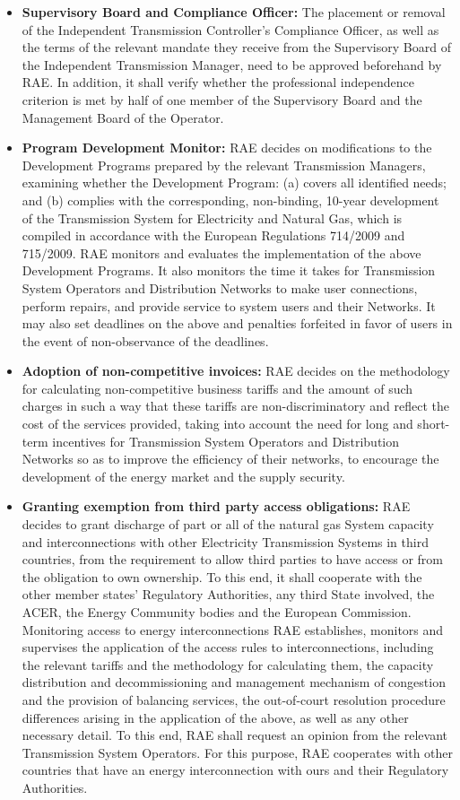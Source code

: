 \begin{itemize}
\item{\textbf{Supervisory Board and Compliance Officer:}}
The placement or removal of the Independent Transmission Controller's Compliance Officer, as well as the terms of the relevant mandate they receive from the Supervisory Board of the Independent Transmission Manager, need to be approved beforehand by RAE. In addition, it shall verify whether the professional independence criterion is met by half of one member of the Supervisory Board and the Management Board of the Operator.
\item{\textbf{Program Development Monitor:}}
RAE decides on modifications to the Development Programs prepared by the relevant Transmission Managers, examining whether the Development Program: (a) covers all identified needs; and (b) complies with the corresponding, non-binding, 10-year development of the Transmission System for Electricity and Natural Gas, which is compiled in accordance with the European Regulations 714/2009 and 715/2009. RAE monitors and evaluates the implementation of the above Development Programs. It also monitors the time it takes for Transmission System Operators and Distribution Networks to make user connections, perform repairs, and provide service to system users and their Networks. It may also set deadlines on the above and penalties forfeited in favor of users in the event of non-observance of the deadlines.
\item{\textbf{Adoption of non-competitive invoices:}}
RAE decides on the methodology for calculating non-competitive business tariffs and the amount of such charges in such a way that these tariffs are non-discriminatory and reflect the cost of the services provided, taking into account the need for long and short-term incentives for Transmission System Operators and Distribution Networks so as to improve the efficiency of their networks, to encourage the development of the energy market and the supply security.
\item{\textbf{Granting exemption from third party access obligations:}}
RAE decides to grant discharge of part or all of the natural gas System capacity and interconnections with other Electricity Transmission Systems in third countries, from the requirement to allow third parties to have access or from the obligation to own ownership. To this end, it shall cooperate with the other member states’ Regulatory Authorities, any third State involved, the ACER, the Energy Community bodies and the European Commission. Monitoring access to energy interconnections RAE establishes, monitors and supervises the application of the access rules to interconnections, including the relevant tariffs and the methodology for calculating them, the capacity distribution and decommissioning and management mechanism of congestion and the provision of balancing services, the out-of-court resolution procedure differences arising in the application of the above, as well as any other necessary detail. To this end, RAE shall request an opinion from the relevant Transmission System Operators. For this purpose, RAE cooperates with other countries that have an energy interconnection with ours and their Regulatory Authorities.

\end{itemize}
